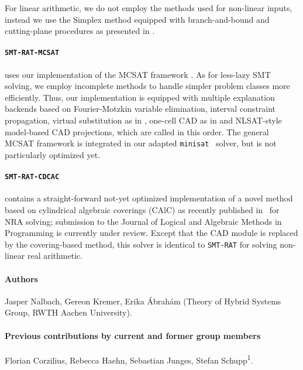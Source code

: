 \documentclass{article}
\begin{document}
For linear arithmetic, we do not employ the methods used for non-linear inputs, instead we use the Simplex method equipped with branch-and-bound and cutting-plane procedures as presented in \cite{DM06}.


\paragraph{\texttt{SMT-RAT-MCSAT}} uses our implementation of the MCSAT framework \cite{Moura2013}.
As for less-lazy SMT solving, we employ incomplete methods to handle simpler problem classes more efficiently. Thus, our implementation is equipped with multiple explanation backends based on Fourier-Motzkin variable elimination, interval constraint propagation, virtual substitution as in \cite{Abraham2017}, one-cell CAD as in \cite{Neuss2018} and NLSAT-style model-based CAD projections, which are called in this order. The general MCSAT framework is integrated in our adapted \texttt{minisat}~\cite{Een2003} solver, but is not particularly optimized yet.

\paragraph{\texttt{SMT-RAT-CDCAC}} contains a straight-forward not-yet optimized implementation of a novel method based on cylindrical algebraic coverings (CAlC) as recently published in~\cite{Abraham2020} for NRA solving; submission to the Journal of Logical and Algebraic Methods in Programming is currently under review. Except that the CAD module is replaced by the covering-based method, this solver is identical to \texttt{SMT-RAT} for solving non-linear real arithmetic.

\newpage

\paragraph{Authors}
Jasper Nalbach, Gereon Kremer, Erika \'Abrah\'am
(Theory of Hybrid Systems Group, RWTH Aachen University).

\paragraph{Previous contributions by current and former group members}
Florian Corzilius,
Rebecca Haehn,
Sebastian Junges,
Stefan Schupp\textsuperscript{1}.




\end{document}
